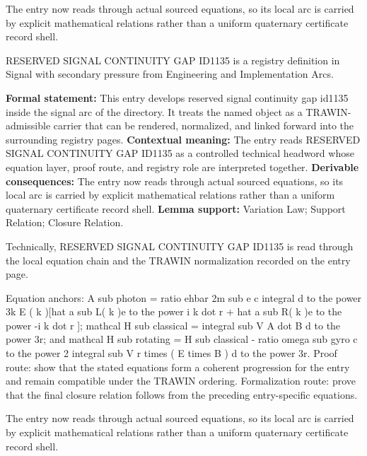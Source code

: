 The entry now reads through actual sourced equations, so its local arc is carried by explicit mathematical relations rather than a uniform quaternary certificate record shell.
\clearpage


\begingroup\small
{}
RESERVED SIGNAL CONTINUITY GAP ID1135 is a registry definition in Signal with secondary pressure from Engineering and Implementation Arcs.

\begingroup\footnotesize\setlength{\emergencystretch}{3em}\sloppy
\textbf{Formal statement:} This entry develops reserved signal continuity gap id1135 inside the signal arc of the directory. It treats the named object as a TRAWIN-admissible carrier that can be rendered, normalized, and linked forward into the surrounding registry pages. \textbf{Contextual meaning:} The entry reads RESERVED SIGNAL CONTINUITY GAP ID1135 as a controlled technical headword whose equation layer, proof route, and registry role are interpreted together. \textbf{Derivable consequences:} The entry now reads through actual sourced equations, so its local arc is carried by explicit mathematical relations rather than a uniform quaternary certificate record shell. \textbf{Lemma support:} Variation Law; Support Relation; Closure Relation.\par
\endgroup

Technically, RESERVED SIGNAL CONTINUITY GAP ID1135 is read through the local equation chain and the TRAWIN normalization recorded on the entry page.

Equation anchors: A sub photon = ratio ehbar 2m sub e c integral d to the power 3k E ( k )[hat a sub L( k )e to the power i k dot r + hat a sub R( k )e to the power -i k dot r ]; mathcal H sub classical = integral sub V A dot B d to the power 3r; and mathcal H sub rotating = H sub classical - ratio omega sub gyro c to the power 2 integral sub V r times ( E times B ) d to the power 3r. Proof route: show that the stated equations form a coherent progression for the entry and remain compatible under the TRAWIN ordering. Formalization route: prove that the final closure relation follows from the preceding entry-specific equations.

The entry now reads through actual sourced equations, so its local arc is carried by explicit mathematical relations rather than a uniform quaternary certificate record shell.
\endgroup

